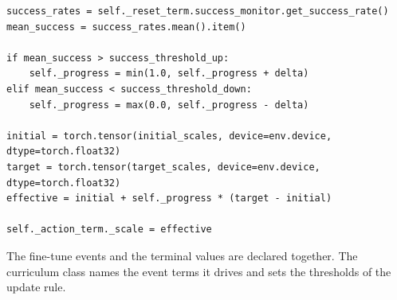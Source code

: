 \begin{snippetbox}[11]
\begin{lstlisting}[firstnumber=2084]
success_rates = self._reset_term.success_monitor.get_success_rate()
mean_success = success_rates.mean().item()

if mean_success > success_threshold_up:
    self._progress = min(1.0, self._progress + delta)
elif mean_success < success_threshold_down:
    self._progress = max(0.0, self._progress - delta)

initial = torch.tensor(initial_scales, device=env.device, dtype=torch.float32)
target = torch.tensor(target_scales, device=env.device, dtype=torch.float32)
effective = initial + self._progress * (target - initial)

self._action_term._scale = effective
\end{lstlisting}
\end{snippetbox}

The fine-tune events and the terminal values are declared together. The curriculum class names the event terms it drives and sets the thresholds of the update rule.

